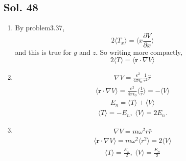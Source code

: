         \subsection*{Sol. 48}
        \begin{enumerate}
            \item 
            By problem3.37,
            $$
            2\langle T_x\rangle
            =\langle x\frac{\partial V}{\partial x}\rangle
            $$
            and this is true for $y$ and $z.$ So writing more compactly,
            $$
            2\langle T\rangle
            =\langle \bm r\cdot \nabla V\rangle
            $$
            \item 
            \begin{align*}
               \nabla V = \frac{e^2}{4\pi\epsilon_0}\frac{1}{r^2}\hat r
            \end{align*}
            \begin{align*}
                \langle\bm r\cdot \nabla V\rangle
                = \frac{e^2}{4\pi\epsilon_0}
                \langle 
                \frac{1}{r}
                \rangle = -\langle V\rangle
            \end{align*}
            \begin{align*}
                E_n = \langle T \rangle + \langle V\rangle
            \end{align*}
            \begin{align*}
                \langle T \rangle = -E_n,\; 
                \langle V \rangle = 2E_n.
            \end{align*}
            \item 
            \begin{align*}
                \nabla V = 
                m\omega^2r\hat r
            \end{align*}
            \begin{align*}
                \langle\bm r\cdot \nabla V\rangle = 
                m\omega^2\langle r^2\rangle
                =2\langle V\rangle
            \end{align*}
            \begin{align*}
                \langle T \rangle
                =\frac{E_n}{2},\; 
                \langle V \rangle
                =\frac{E_n}{2}
            \end{align*}
            
        \end{enumerate}
